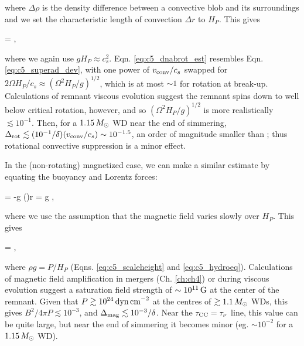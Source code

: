 \noindent where $\Delta \rho$ is the density difference between a convective blob and its surroundings and we set the characteristic length of convection $\Delta r$ to $H_P$.  This gives

\eqbegin
\dnabrot = ,
\label{eq:c5_dnabrot_est}
\eqend

\noindent where we again use $g H_P \approx c_s^2$.  Eqn. \ref{eq:c5_dnabrot_est} resembles Eqn. \ref{eq:c5_superad_dev}, with one power of $\vconv/c_s$ swapped for $2\Omega H_P/c_s \approx (\Omega^2 H_P/g)^{1/2}$, which is at most $\sim1$ for rotation at break-up.  Calculations of remnant viscous evolution \citep{shen+12, schw+12, ji+13} suggest the remnant spins down to well below critical rotation, however, and so $(\Omega^2 H_P/g)^{1/2}$ is more realistically $\lesssim10^{-1}$.  Then, for a $1.15\,\Msun$ WD near the end of simmering, $\dnabrot \lesssim (10^{-1}/\delta)(\vconv/c_s) \sim 10^{-1.5}$, an order of magnitude smaller than \nablaad; thus rotational convective suppression is a minor effect.  

In the (non-rotating) magnetized case, we can make a similar estimate by equating the buoyancy and Lorentz forces:

\eqbegin
{} = -g \left(\right)\Delta r = \rho g \delta \dnabmag,
\label{eq:c5_dnabmag_est_work}
\eqend

\noindent where we use the assumption that the magnetic field varies slowly over $H_P$.  This gives

\eqbegin
\dnabmag = ,
\label{eq:c5_dnabmag_est}
\eqend

\noindent where $\rho g = P/H_P$ (Eqns. \ref{eq:c5_scaleheight} and \ref{eq:c5_hydroeq}).  Calculations of magnetic field amplification in mergers (Ch. \ref{ch:ch4}) or during viscous evolution \citep{ji+13} suggest a saturation field strength of $\sim10^{11}\,\mathrm{G}$ at the center of the remnant.  Given that $P \gtrsim 10^{24}\,\mathrm{dyn\,cm}^{-2}$ at the centres of $\gtrsim 1.1\,\Msun$ WDs, this gives $B^2/4\pi P \lesssim 10^{-3}$, and $\dnabmag \lesssim 10^{-3}/\delta$.  Near the $\taucc = \taunu$ line, this value can be quite large, but near the end of simmering it becomes minor (eg. $\sim10^{-2}$ for a $1.15\,\Msun$ WD).

